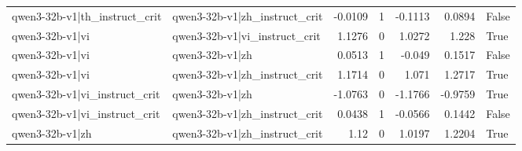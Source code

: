 \begin{table}
\begin{tabular}{l l r r r r l}
qwen3-32b-v1|th_instruct_crit & qwen3-32b-v1|zh_instruct_crit & -0.0109 & 1 & -0.1113 & 0.0894 & False \\
qwen3-32b-v1|vi & qwen3-32b-v1|vi_instruct_crit & 1.1276 & 0 & 1.0272 & 1.228 & True \\
qwen3-32b-v1|vi & qwen3-32b-v1|zh & 0.0513 & 1 & -0.049 & 0.1517 & False \\
qwen3-32b-v1|vi & qwen3-32b-v1|zh_instruct_crit & 1.1714 & 0 & 1.071 & 1.2717 & True \\
qwen3-32b-v1|vi_instruct_crit & qwen3-32b-v1|zh & -1.0763 & 0 & -1.1766 & -0.9759 & True \\
qwen3-32b-v1|vi_instruct_crit & qwen3-32b-v1|zh_instruct_crit & 0.0438 & 1 & -0.0566 & 0.1442 & False \\
qwen3-32b-v1|zh & qwen3-32b-v1|zh_instruct_crit & 1.12 & 0 & 1.0197 & 1.2204 & True \\
\bottomrule
\end{tabular}
\end{table}
